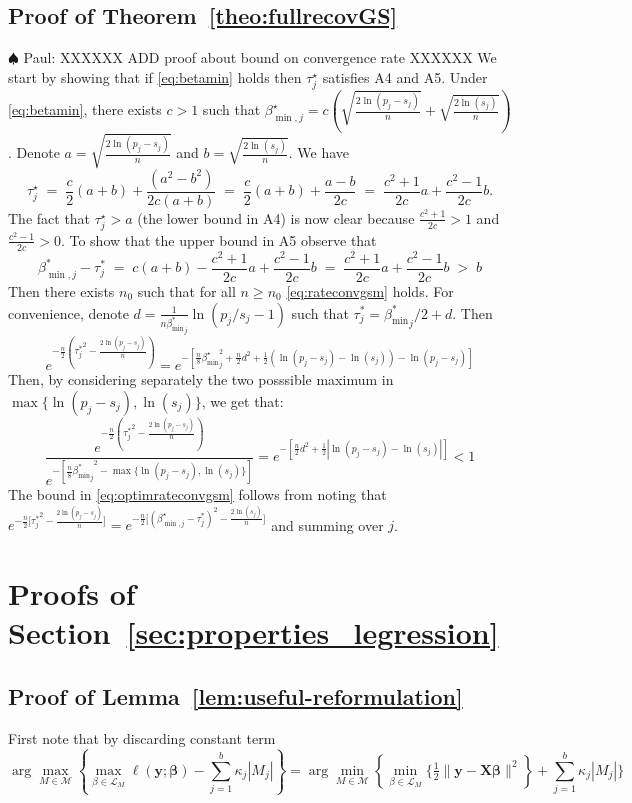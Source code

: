 \documentclass[aos]{imsart}
\theoremstyle{plain}
\newcommand{\paul}[1]{{\small{\color{green} \sf $\spadesuit$ Paul: #1}}}
\newcommand{\bs}{\boldsymbol}
\begin{document}
\begin{supplement}
\subsection{Proof of Theorem~\ref{theo:fullrecovGS}}
\paul{XXXXXX ADD proof about bound on convergence rate XXXXXX}
We start by showing that if \eqref{eq:betamin} holds then $\tau^\star_j$ satisfies A4 and A5. Under \eqref{eq:betamin}, there exists $c>1$ such that $\beta^\star_{\min,j}=c(\sqrt{\tfrac{2\ln(p_j-s_j)}{n}} + \sqrt{\tfrac{2\ln(s_j)}{n}})$. Denote $a=\sqrt{\tfrac{2\ln(p_j-s_j)}{n}}$ and $b=\sqrt{\tfrac{2\ln(s_j)}{n}}$. We have
$$
\tau_j^\star\;=\;\frac{c}{2} (a+b)+\frac{(a^2-b^2)}{2c(a+b)}\;=\;\frac{c}{2} (a+b)+\frac{a-b}{2c}\;=\;\frac{c^2+1}{2c}a+\frac{c^2-1}{2c}b.
$$
The fact that $\tau^\star_j>a$ (the lower bound in A4) is now clear because $\tfrac{c^2+1}{2c}> 1$  and $\tfrac{c^2-1}{2c}> 0$. To show that the upper bound in A5 observe that
$$
\beta_{\min,j}^* - \tau^*_j \;=\; c(a+b)- \frac{c^2+1}{2c}a+\frac{c^2-1}{2c}b \;= \; \frac{c^2+1}{2c}a+\frac{c^2-1}{2c}b\;>\;  b 
$$
Then there exists $n_0$ such that for all $n\geq n_0$ \eqref{eq:rateconvgsm} holds. For convenience, denote $d = \frac{1}{n {\beta_{\min}^*}_j} \ln (p_j / s_j-1)$ such that $\tau^*_j= {\beta_{\min}^*}_j/2 + d$. Then
$$e^{-\frac{n}{2}\left({\tau^*_j}^2-\frac{2\ln(p_j-s_j)}{n}\right)}
=e^{-\left[\frac{n}{8}{\beta_{\min}^{\star}}_j^2+\frac{n}{2}d^2 + \frac{1}{2}\left(\ln (p_j- s_j)-\ln (s_j)\right) -\ln (p_j- s_j)\right]}$$
Then, by considering separately the two posssible maximum in $\max\{\ln(p_j-s_j),\ln(s_j)\}$, we get that:
$$\frac{e^{-\frac{n}{2}\left({\tau^*_j}^2-\frac{2\ln(p_j-s_j)}{n}\right)}}{e^{-[\frac{n}{8}{{\beta_{\min}^*}_j}^2-\max\{\ln(p_j-s_j),\ln(s_j)\}]}}= 
e^{-\left[\frac{n}{2}d^2 + \frac{1}{2}\left|\ln (p_j- s_j)-\ln (s_j)\right|\right]} <1$$
The bound in \eqref{eq:optimrateconvgsm} follows from noting that $e^{-\tfrac{n}{2}\big[{\tau_j^*}^2-\tfrac{2\ln(p_j-s_j)}{n}\big]}=e^{-\tfrac{n}{2}\big[(\beta^\star_{\min,j}-{\tau_j^*})^2-\tfrac{2\ln(s_j)}{n}\big]}$ and summing over $j$.


\section{Proofs of Section~\ref{sec:properties_legression}}
\subsection{Proof of Lemma~\ref{lem:useful-reformulation}}
	First note that by discarding constant term 
 $$\arg\max_{M\in \mathcal{M}} \left\{\max_{\beta\in \mathcal{L}_M}\ell(\bs y; \bs \beta)-\sum_{j=1}^b\kappa_j |M_j| \right\}=\arg\min_{M\in \mathcal{M}} \left\{\min_{\beta\in \mathcal{L}_M}\bigg\{ \tfrac{1}{2}\|\bs y-\bs X\bs\beta\|^2\right\}+\sum_{j=1}^b\kappa_j |M_j| \bigg\}$$
 

\end{supplement}
\end{document}
